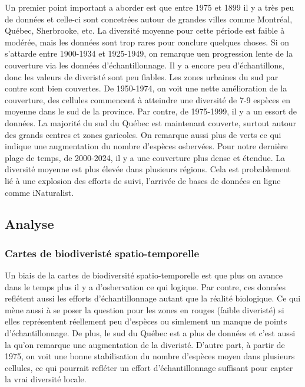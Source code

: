 \documentclass[9pt,twocolumn,twoside,]{pnas-new}
\begin{document}
Un premier point important a aborder est que entre 1975 et 1899 il y a
très peu de données et celle-ci sont concetrées autour de grandes villes
comme Montréal, Québec, Sherbrooke, etc. La diversité moyenne pour cette
période est faible à modérée, mais les données sont trop rares pour
conclure quelques choses. Si on s'attarde entre 1900-1934 et 1925-1949,
on remarque uen progression lente de la couverture via les données
d'échantillonnage. Il y a encore peu d'échantillons, donc les valeurs de
diveristé sont peu fiables. Les zones urbaines du sud par contre sont
bien couvertes. De 1950-1974, on voit une nette amélioration de la
couverture, des cellules commencent à atteindre une diversité de 7-9
espèces en moyenne dans le sud de la province. Par contre, de 1975-1999,
il y a un essort de données. La majorité du sud du Québec est maintenant
couverte, surtout autour des grands centres et zones garicoles. On
remarque aussi plus de verts ce qui indique une augmentation du nombre
d'espèces osbervées. Pour notre dernière plage de temps, de 2000-2024,
il y a une couverture plus dense et étendue. La diversité moyenne est
plus élevée dans plusieurs régions. Cela est probablement lié à une
explosion des efforts de suivi, l'arrivée de bases de données en ligne
comme iNaturalist.

\subsection{\texorpdfstring{\textbf{Analyse}}{Analyse}}\label{analyse}

\subsubsection{Cartes de biodiveristé
spatio-temporelle}\label{cartes-de-biodiveristuxe9-spatio-temporelle-2}

Un biais de la cartes de biodiversité spatio-temporelle est que plus on
avance dans le temps plus il y a d'osbervation ce qui logique. Par
contre, ces données reflétent aussi les efforts d'échantillonnage autant
que la réalité biologique. Ce qui mène aussi à se poser la question pour
les zones en rouges (faible diveristé) si elles représentent réellement
peu d'espèces ou simlement un manque de points d'échantillonnage. De
plus, le sud du Québec est a plus de données et c'est aussi la qu'on
remarque une augmentation de la diveristé. D'autre part, à partir de
1975, on voit une bonne stabilisation du nombre d'espèces moyen dans
plusieurs cellules, ce qui pourrait refléter un effort d'échantillonnage
suffisant pour capter la vrai diversité locale.
\end{document}

